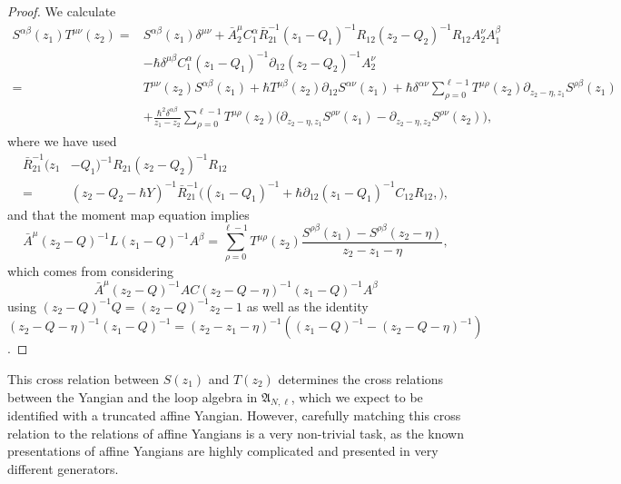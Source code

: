 \begin{proof}
We calculate
\begin{align*}
S^{\alpha\beta}(z_1) T^{\mu\nu}(z_2)
={}& S^{\alpha\beta}(z_1) \delta^{\mu\nu} +\bar A_2^\mu C_1^\alpha \bar R_{21}^{-1} (z_1-Q_1)^{-1} R_{12} (z_2-Q_2)^{-1} R_{12} A_2^\nu A_1^\beta \\
&- \hbar \delta^{\mu\beta} C_1^\alpha (z_1-Q_1)^{-1} \partial_{12} (z_2-Q_2)^{-1} A_2^\nu \\
={}& T^{\mu\nu}(z_2) S^{\alpha\beta}(z_1) + \hbar T^{\mu\beta}(z_2) \partial_{12}S^{\alpha\nu}(z_1) + \hbar \delta^{\alpha\nu} \sum_{\rho=0}^{\ell-1} T^{\mu\rho}(z_2) \partial_{z_2-\eta,z_1} S^{\rho\beta}(z_1) \\
&+ \frac{\hbar^2 \delta^{\alpha\beta}}{z_1-z_2} \sum_{\rho=0}^{\ell-1} T^{\mu\rho}(z_2) \big( \partial_{z_2-\eta,z_1} S^{\rho\nu}(z_1) - \partial_{z_2-\eta,z_2} S^{\rho\nu}(z_2) \big),
\end{align*}
where we have used 
\begin{align*}
\bar R_{21}^{-1} (z_1&-Q_1)^{-1} R_{21} (z_2-Q_2)^{-1} R_{12} \\
={}& (z_2-Q_2-\hbar Y)^{-1} \bar R_{21}^{-1} \big( (z_1-Q_1)^{-1} + \hbar \partial_{12} (z_1-Q_1)^{-1} C_{12} R_{12} ,
\big),
\end{align*}
and that the moment map equation implies
\begin{equation*}
\bar A^\mu (z_2-Q)^{-1} L (z_1-Q)^{-1} A^\beta = \sum_{\rho=0}^{\ell-1} T^{\mu\rho}(z_2) \frac{S^{\rho\beta}(z_1)-S^{\rho\beta}(z_2-\eta)}{z_2-z_1-\eta},
\end{equation*}
which comes from considering
\begin{equation*}
\bar A^\mu (z_2-Q)^{-1} AC (z_2-Q-\eta)^{-1} (z_1-Q)^{-1} A^\beta
\end{equation*}
using $(z_2-Q)^{-1} Q = (z_2-Q)^{-1} z_2 - 1$ as well as the identity $(z_2-Q-\eta)^{-1} (z_1-Q)^{-1} = (z_2-z_1-\eta)^{-1} \left( (z_1-Q)^{-1} - (z_2-Q-\eta)^{-1} \right)$.
\end{proof}

\begin{remark}
This cross relation between $S(z_1)$ and $T(z_2)$ determines the cross relations between the Yangian and the loop algebra in $\mathfrak{A}_{N,\ell}$, which we expect to be identified with a truncated affine Yangian. However, carefully matching this cross relation to the relations of affine Yangians is a very non-trivial task, as the known presentations of affine Yangians are highly complicated and presented in very different generators.
\end{remark}

